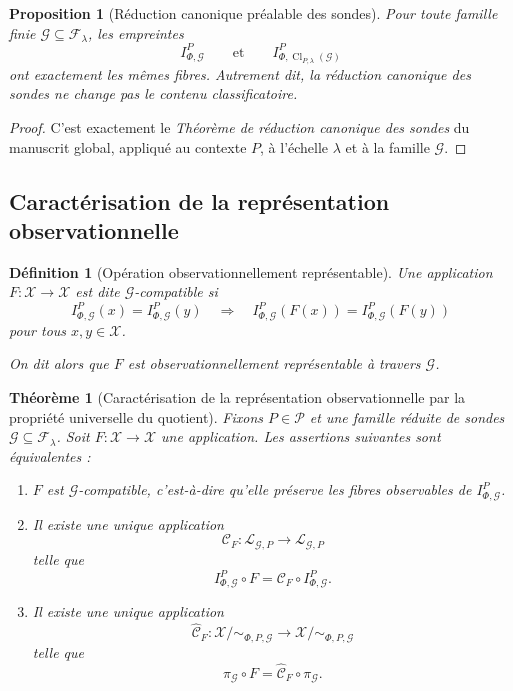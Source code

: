 \documentclass[11pt,a4paper]{article}
\newtheorem{definition}{Définition}
\newtheorem{proposition}{Proposition}
\newtheorem{theorem}{Théorème}
\begin{document}
\begin{appendices}
\begin{proposition}[Réduction canonique préalable des sondes]
\label{prop:reduction-prealable}
Pour toute famille finie \(\mathcal G\subseteq\mathcal F_\lambda\), les empreintes
\[
I_{\Phi,\mathcal G}^P
\qquad\text{et}\qquad
I_{\Phi,\operatorname{Cl}_{P,\lambda}(\mathcal G)}^P
\]
ont exactement les mêmes fibres.
Autrement dit, la réduction canonique des sondes ne change pas le contenu classificatoire.
\end{proposition}

\begin{proof}
C'est exactement le \emph{Théorème de réduction canonique des sondes} du manuscrit global, appliqué au contexte \(P\), à l'échelle \(\lambda\) et à la famille \(\mathcal G\).
\end{proof}

\subsection{Caractérisation de la représentation observationnelle}

\begin{definition}[Opération observationnellement représentable]
Une application \(F:\mathcal X\to\mathcal X\) est dite \(\mathcal G\)-compatible si
\[
I_{\Phi,\mathcal G}^P(x)=I_{\Phi,\mathcal G}^P(y)
\quad\Longrightarrow\quad
I_{\Phi,\mathcal G}^P(F(x))=I_{\Phi,\mathcal G}^P(F(y))
\]
pour tous \(x,y\in\mathcal X\).

On dit alors que \(F\) est observationnellement représentable à travers \(\mathcal G\).
\end{definition}

\begin{theorem}[Caractérisation de la représentation observationnelle par la propriété universelle du quotient]
\label{thm:representation-observationnelle}
Fixons \(P\in\mathcal P\) et une famille réduite de sondes \(\mathcal G\subseteq\mathcal F_\lambda\). Soit \(F:\mathcal X\to\mathcal X\) une application. Les assertions suivantes sont équivalentes :
\begin{enumerate}[label=\textbf{(\arabic*)}]
\item \(F\) est \(\mathcal G\)-compatible, c'est-à-dire qu'elle préserve les fibres observables de \(I_{\Phi,\mathcal G}^P\).
\item Il existe une unique application
\[
\mathcal C_F:\mathcal L_{\mathcal G,P}\longrightarrow \mathcal L_{\mathcal G,P}
\]
telle que
\[
I_{\Phi,\mathcal G}^P\circ F=\mathcal C_F\circ I_{\Phi,\mathcal G}^P.
\]
\item Il existe une unique application
\[
\widehat{\mathcal C}_F:\mathcal X/{\sim_{\Phi,P,\mathcal G}}\longrightarrow \mathcal X/{\sim_{\Phi,P,\mathcal G}}
\]
telle que
\[
\pi_{\mathcal G}\circ F=\widehat{\mathcal C}_F\circ \pi_{\mathcal G}.
\]
\end{enumerate}


\end{theorem}
\end{appendices}
\end{document}
